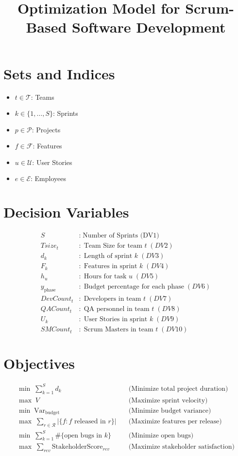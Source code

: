 \documentclass{article}
\begin{document}
\title{Optimization Model for Scrum-Based Software Development}
\author{}
\date{}
\maketitle

\section*{Sets and Indices}
\begin{itemize}
  \item $t \in \mathcal{T}$: Teams
  \item $k \in \{1,\dots,S\}$: Sprints
  \item $p \in \mathcal{P}$: Projects
  \item $f \in \mathcal{F}$: Features
  \item $u \in \mathcal{U}$: User Stories
  \item $e \in \mathcal{E}$: Employees
\end{itemize}

\section*{Decision Variables}
\begin{align*}
  S &:\;\text{Number of Sprints (DV1)}\\
  Tsize_t &:\;\text{Team Size for team }t\;(DV2)\\
  d_k &:\;\text{Length of sprint }k\;(DV3)\\
  F_k &:\;\text{Features in sprint }k\;(DV4)\\
  h_u &:\;\text{Hours for task }u\;(DV5)\\
  y_{\text{phase}} &:\;\text{Budget percentage for each phase}\;(DV6)\\
  DevCount_t &:\;\text{Developers in team }t\;(DV7)\\
  QACount_t &:\;\text{QA personnel in team }t\;(DV8)\\
  U_k &:\;\text{User Stories in sprint }k\;(DV9)\\
  SMCount_t &:\;\text{Scrum Masters in team }t\;(DV10)
\end{align*}

\section*{Objectives}
\begin{align}
  \min\;\sum_{k=1}^S d_k
  &\quad \text{(Minimize total project duration)} \\
  \max\;V
  &\quad \text{(Maximize sprint velocity)} \\
  \min\;\text{Var}_{\text{budget}}
  &\quad \text{(Minimize budget variance)} \\
  \max\;\sum_{r\in \mathcal{R}} \lvert \{ f: f \text{ released in }r \}\rvert
  &\quad \text{(Maximize features per release)} \\
  \min\;\sum_{k=1}^S \#\{\text{open bugs in }k\}
  &\quad \text{(Minimize open bugs)} \\
  \max\;\sum_{rev}\text{StakeholderScore}_{rev}
  &\quad \text{(Maximize stakeholder satisfaction)}
\end{align}
\end{document}

